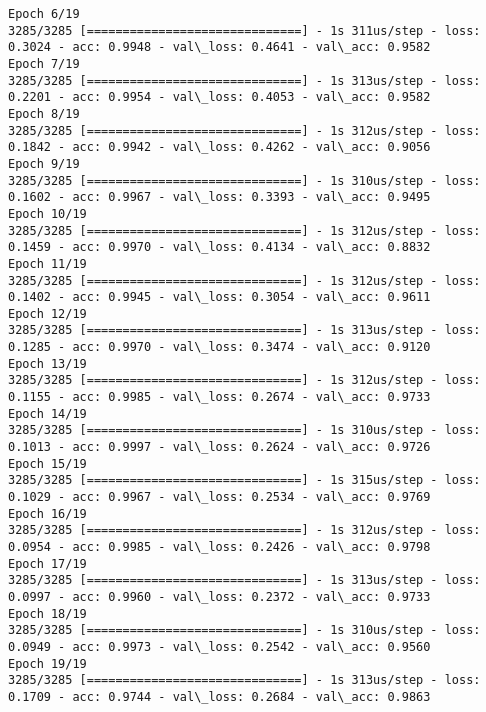 \documentclass[11pt]{article}
\begin{document}
\begin{Verbatim}[commandchars=\\\{\}]
Epoch 6/19
3285/3285 [==============================] - 1s 311us/step - loss: 0.3024 - acc: 0.9948 - val\_loss: 0.4641 - val\_acc: 0.9582
Epoch 7/19
3285/3285 [==============================] - 1s 313us/step - loss: 0.2201 - acc: 0.9954 - val\_loss: 0.4053 - val\_acc: 0.9582
Epoch 8/19
3285/3285 [==============================] - 1s 312us/step - loss: 0.1842 - acc: 0.9942 - val\_loss: 0.4262 - val\_acc: 0.9056
Epoch 9/19
3285/3285 [==============================] - 1s 310us/step - loss: 0.1602 - acc: 0.9967 - val\_loss: 0.3393 - val\_acc: 0.9495
Epoch 10/19
3285/3285 [==============================] - 1s 312us/step - loss: 0.1459 - acc: 0.9970 - val\_loss: 0.4134 - val\_acc: 0.8832
Epoch 11/19
3285/3285 [==============================] - 1s 312us/step - loss: 0.1402 - acc: 0.9945 - val\_loss: 0.3054 - val\_acc: 0.9611
Epoch 12/19
3285/3285 [==============================] - 1s 313us/step - loss: 0.1285 - acc: 0.9970 - val\_loss: 0.3474 - val\_acc: 0.9120
Epoch 13/19
3285/3285 [==============================] - 1s 312us/step - loss: 0.1155 - acc: 0.9985 - val\_loss: 0.2674 - val\_acc: 0.9733
Epoch 14/19
3285/3285 [==============================] - 1s 310us/step - loss: 0.1013 - acc: 0.9997 - val\_loss: 0.2624 - val\_acc: 0.9726
Epoch 15/19
3285/3285 [==============================] - 1s 315us/step - loss: 0.1029 - acc: 0.9967 - val\_loss: 0.2534 - val\_acc: 0.9769
Epoch 16/19
3285/3285 [==============================] - 1s 312us/step - loss: 0.0954 - acc: 0.9985 - val\_loss: 0.2426 - val\_acc: 0.9798
Epoch 17/19
3285/3285 [==============================] - 1s 313us/step - loss: 0.0997 - acc: 0.9960 - val\_loss: 0.2372 - val\_acc: 0.9733
Epoch 18/19
3285/3285 [==============================] - 1s 310us/step - loss: 0.0949 - acc: 0.9973 - val\_loss: 0.2542 - val\_acc: 0.9560
Epoch 19/19
3285/3285 [==============================] - 1s 313us/step - loss: 0.1709 - acc: 0.9744 - val\_loss: 0.2684 - val\_acc: 0.9863

    \end{Verbatim}
\end{document}
